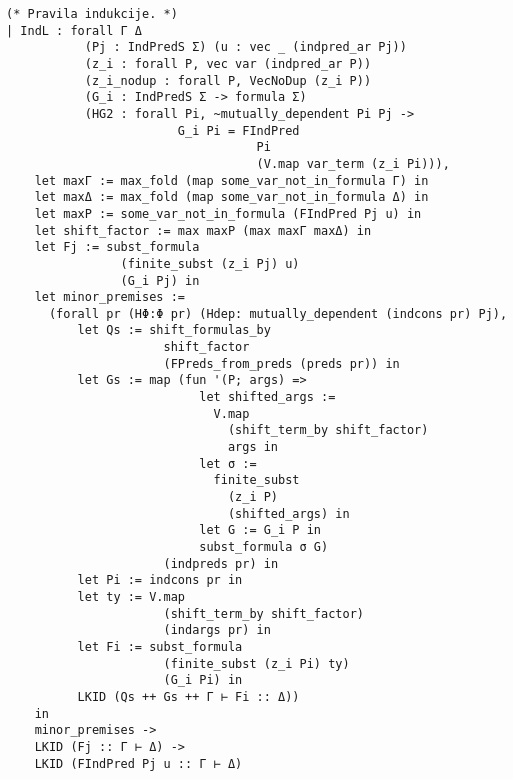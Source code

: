 \begin{verbatim}
(* Pravila indukcije. *)
| IndL : forall Γ Δ
           (Pj : IndPredS Σ) (u : vec _ (indpred_ar Pj))
           (z_i : forall P, vec var (indpred_ar P))
           (z_i_nodup : forall P, VecNoDup (z_i P))
           (G_i : IndPredS Σ -> formula Σ)
           (HG2 : forall Pi, ~mutually_dependent Pi Pj ->
                        G_i Pi = FIndPred
                                   Pi
                                   (V.map var_term (z_i Pi))),
    let maxΓ := max_fold (map some_var_not_in_formula Γ) in
    let maxΔ := max_fold (map some_var_not_in_formula Δ) in
    let maxP := some_var_not_in_formula (FIndPred Pj u) in
    let shift_factor := max maxP (max maxΓ maxΔ) in
    let Fj := subst_formula
                (finite_subst (z_i Pj) u)
                (G_i Pj) in
    let minor_premises :=
      (forall pr (HΦ:Φ pr) (Hdep: mutually_dependent (indcons pr) Pj),
          let Qs := shift_formulas_by
                      shift_factor
                      (FPreds_from_preds (preds pr)) in
          let Gs := map (fun '(P; args) =>
                           let shifted_args :=
                             V.map
                               (shift_term_by shift_factor)
                               args in
                           let σ :=
                             finite_subst
                               (z_i P)
                               (shifted_args) in
                           let G := G_i P in
                           subst_formula σ G)
                      (indpreds pr) in
          let Pi := indcons pr in
          let ty := V.map
                      (shift_term_by shift_factor)
                      (indargs pr) in
          let Fi := subst_formula
                      (finite_subst (z_i Pi) ty)
                      (G_i Pi) in
          LKID (Qs ++ Gs ++ Γ ⊢ Fi :: Δ))
    in
    minor_premises ->
    LKID (Fj :: Γ ⊢ Δ) ->
    LKID (FIndPred Pj u :: Γ ⊢ Δ)
\end{verbatim}

